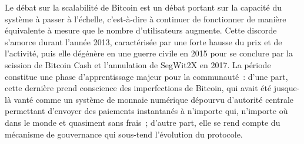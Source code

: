 Le débat sur la scalabilité de Bitcoin est un débat portant sur la capacité du système à passer à l'échelle, c'est-à-dire à continuer de fonctionner de manière équivalente à mesure que le nombre d'utilisateurs augmente. Cette discorde s'amorce durant l'année 2013, caractérisée par une forte hausse du prix et de l'activité, puis elle dégénère en une guerre civile en 2015 pour se conclure par la scission de Bitcoin Cash et l'annulation de SegWit2X en 2017. La période constitue une phase d'apprentissage majeur pour la communauté~: d'une part, cette dernière prend conscience des imperfections de Bitcoin, qui avait été jusque-là vanté comme un système de monnaie numérique dépourvu d'autorité centrale permettant d'envoyer des paiements instantanés à n'importe qui, n'importe où dans le monde et quasiment sans frais~; d'autre part, elle se rend compte du mécanisme de gouvernance qui sous-tend l'évolution du protocole.

%

